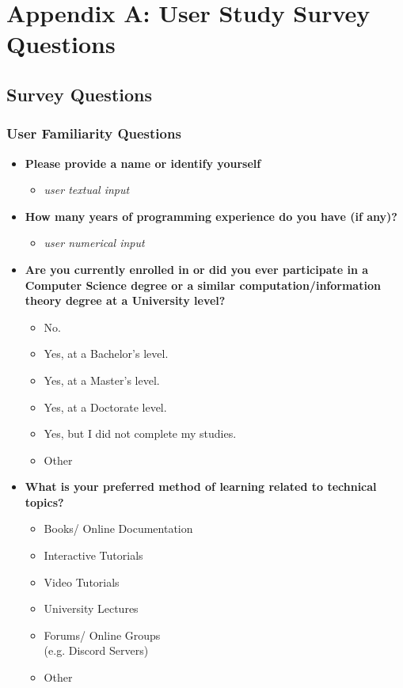 \chapter{Appendix A: User Study Survey Questions}
\section{Survey Questions}
%

\subsection{User Familiarity Questions}
\begin{itemize}
	\item  \textbf{Please provide a name or identify yourself}
	      \begin{itemize}
		      \item  \textit{user textual input}

	      \end{itemize}

	\item  \textbf{How many years of programming experience do you have (if any)?}
	      \begin{itemize}
		      \item  \textit{user numerical input}

	      \end{itemize}
	\item  \textbf{Are you currently enrolled in or did you ever participate in a Computer Science degree or a similar computation/information theory degree at a University level?}
	      \begin{itemize}
		      \item  No.
		      \item  Yes, at a Bachelor's level.
		      \item  Yes, at a Master's level.
		      \item  Yes, at a Doctorate level.
		      \item  Yes, but I did not complete my studies.
		      \item  Other
	      \end{itemize}

	\item  \textbf{What is your preferred method of learning related to technical topics?}
	      \begin{itemize}
		      \item Books/ Online Documentation
		      \item Interactive Tutorials
		      \item Video Tutorials
		      \item University Lectures
		      \item Forums/ Online Groups \\(e.g. Discord Servers)
		      \item  Other
	      \end{itemize}


\end{itemize}
